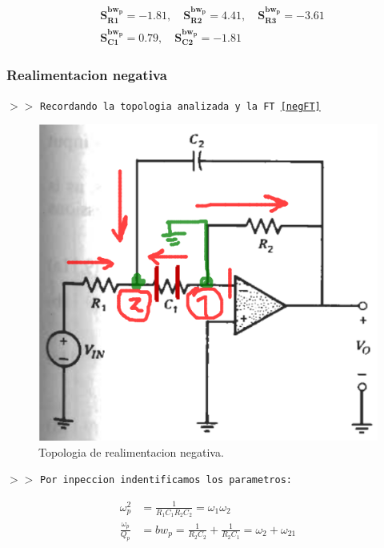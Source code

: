 \begin{align}
    &\mathbf{S^{bw_{p}}_{R1} = -1.81, \quad S^{bw_{p}}_{R2} = 4.41, \quad S^{bw_{p}}_{R3} = -3.61} \\
    &\mathbf{S^{bw_{p}}_{C1} = 0.79, \quad S^{bw_{p}}_{C2} = -1.81}
\end{align}


\subsubsection{Realimentacion negativa}

\noindent $>>$ \texttt{Recordando la topologia analizada y la FT \eqref{negFT}}

\begin{figure}[H]
    \centering
    \includegraphics[scale=.5]{Secciones/Circ1/img/negBiquadBP.png}
    \caption{Topologia de realimentacion negativa.}
    \label{c1}
\end{figure}

\noindent $>>$ \texttt{Por inpeccion indentificamos los parametros:}

\begin{align*}
    \omega_p^{2} &= \frac{1}{R_{1} C_{1} R_{2} C_{2}}
    = \omega_{1} \omega_{2} \\ 
    \frac{\omega_{p}}{Q_{p}} &= bw_p 
    = \frac{1}{R_{2} C_{2}} + \frac{1}{R_{2} C_{1}}
    = \omega_{2} + \omega_{21}
\end{align*}

